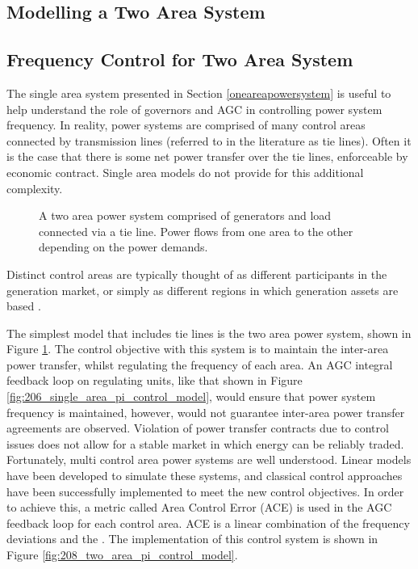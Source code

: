 \clearpage


\subsection{Modelling a Two Area System}


\subsection{Frequency Control for Two Area System}
The single area system presented in Section \ref{oneareapowersystem} is useful to help understand the role of governors and AGC in controlling power system frequency. In reality, power systems are comprised of many control areas connected by transmission lines (referred to in the literature as tie lines). Often it is the case that there is some net power transfer over the tie lines, enforceable by economic contract. Single area models do not provide for this additional complexity.

\begin{figure}[ht]
	\centering
	\resizebox{12cm}{!}{}
	\caption[Overview of two area power system with tie line]{A two area power system comprised of generators and load connected via a tie line. Power flows from one area to the other depending on the power demands.}
	\label{fig:207_two_area_system}
\end{figure}

Distinct control areas are typically thought of as different participants in the generation market, or simply as different regions in which generation assets are based \cite{Kothari2011}.

The simplest model that includes tie lines is the two area power system, shown in Figure \ref{fig:207_two_area_system}. The control objective with this system is to maintain the inter-area power transfer, whilst regulating the frequency of each area. An AGC integral feedback loop on regulating units, like that shown in Figure \ref{fig:206_single_area_pi_control_model}, would ensure that power system frequency is maintained, however, would not guarantee inter-area power transfer agreements are observed. Violation of power transfer contracts due to control issues does not allow for a stable market in which energy can be reliably traded. Fortunately, multi control area power systems are well understood. Linear models have been developed to simulate these systems, and classical control approaches have been successfully implemented to meet the new control objectives. In order to achieve this, a metric called Area Control Error (ACE) is used in the AGC feedback loop for each control area. ACE is a linear combination of the frequency deviations and the . The implementation of this control system is shown in Figure \ref{fig:208_two_area_pi_control_model}.

